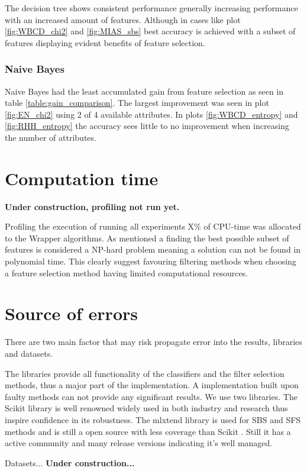 The decision tree shows consistent performance generally increasing performance with an increased amount of features. Although in cases like plot \ref{fig:WBCD_chi2} and \ref{fig:MIAS_sbs} best accuracy is achieved with a subset of features displaying evident benefits of feature selection.



\subsubsection{Naive Bayes}

Naive Bayes had the least accumulated gain from feature selection as seen in table \ref{table:gain_comparison}. The largest improvement was seen in plot \ref{fig:EN_chi2} using 2 of 4 available attributes. In plots \ref{fig:WBCD_entropy} and \ref{fig:RHH_entropy} the accuracy sees little to no improvement when increasing the number of attributes.




\section{Computation time}

\textbf{Under construction, profiling not run yet.}

Profiling the execution of running all experiments X\% of CPU-time was allocated to the Wrapper algorithms. As mentioned a finding the best possible subset of features is considered a NP-hard problem meaning a solution can not be found in polynomial time. This clearly suggest favouring filtering methods when choosing a feature selection method having limited computational resources.

\section{Source of errors}
\label{sec:source_of_errors}

There are two main factor that may risk propagate error into the results, libraries and datasets.

The libraries provide all functionality of the classifiers and the filter selection methods, thus a major part of the implementation. A implementation built upon faulty methods can not provide any significant results. We use two libraries. The Scikit library \parencite{scikit-learn} is well renowned widely used in both industry and research thus inspire confidence in its robustness. The mlxtend library is used for SBS and SFS methods and is still a open source with less coverage than Scikit \parencite{mlextend}. Still it has a active community and many release versions indicating it's well managed.

Datasets... \textbf{Under construction...}

